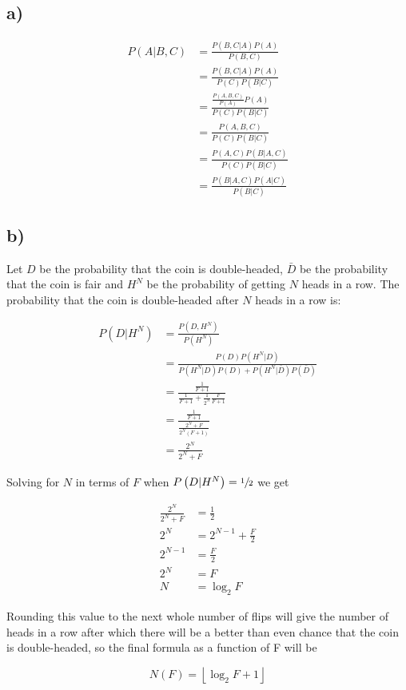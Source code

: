 \documentclass[12pt]{article}
\begin{document}
	\subsection*{a)}
	\begin{align}
	P\left(A \vert B,C\right) &= \frac{P\left(B,C \vert A\right) P\left(A\right)}{P\left(B,C\right)} \\[1em]
	&= \frac{P\left(B,C \vert A\right)P\left(A\right)}{P\left(C\right)P\left(B \vert C\right)} \\[1em]
	&= \frac{\frac{P\left(A,B,C\right)}{P\left(A\right)}P\left(A\right)}{P\left(C\right)P\left(B \vert C\right)} \\[1em]
	&= \frac{P\left(A,B,C\right)}{P\left(C\right)P\left(B \vert C\right)} \\[1em]
	&= \frac{P\left(A,C\right)P\left(B \vert A,C\right)}{P\left(C\right)P\left(B \vert C\right)} \\[1em]
	&= \frac{P\left(B \vert A,C\right)P\left(A \vert C\right)}{P\left(B \vert C\right)}
	\end{align}
	
	\subsection*{b)}
	Let $D$ be the probability that the coin is double-headed, $\bar{D}$ be the probability that the coin is fair and $H^N$ be the probability of getting $N$ heads in a row. The probability that the coin is double-headed after $N$ heads in a row is:
	
	\begin{align}
		P\left(D \vert H^N\right) &= \frac{P\left(D,H^N\right)}{P\left(H^N\right)} \\[0.5em]
		&= \frac{P\left(D\right)P\left(H^N \vert D\right)}{P\left(H^N \vert D\right)P\left(D\right) + P\left(H^N \vert \bar{D}\right)P\left(\bar{D}\right)} \\[0.5em]
		&= \frac{\frac{1}{F + 1}}{\frac{1}{F+1} + \frac{1}{2^N}\frac{F}{F+1}} \\[0.5em]
		&= \frac{\frac{1}{F+1}}{\frac{2^N + F}{2^N\left(F+1\right)}} \\[0.5em]
		&= \frac{2^N}{2^N + F}
	\end{align}
	
	Solving for $N$ in terms of $F$ when $P\left(D \vert H^N\right) = \sfrac{1}{2}$ we get
	
	\begin{align}
		\frac{2^N}{2^N + F} &= \frac{1}{2} \\[0.5em]
		2^N &= 2^{N-1}+\frac{F}{2} \\[0.5em]
		2^{N-1} &= \frac{F}{2} \\[0.5em]
		2^N &= F \\[0.5em]
		N &= \log_2 F
	\end{align}
	
	Rounding this value to the next whole number of flips will give the number of heads in a row after which there will be a better than even chance that the coin is double-headed, so the final formula as a function of F will be
	
	$$N(F)=\left\lfloor{\log_2F+1}\right\rfloor$$
\end{document}
